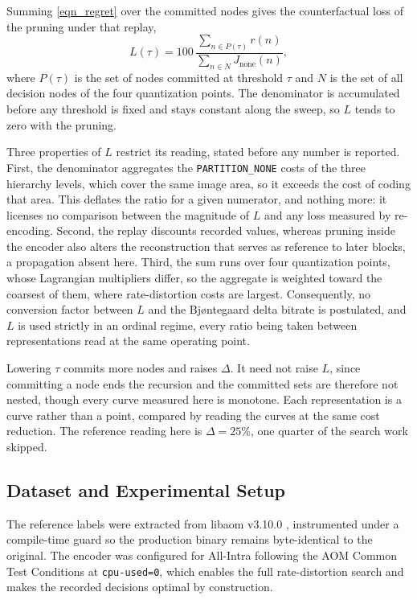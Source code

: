 \documentclass[conference]{IEEEtran}
\begin{document}
Summing \eqref{eqn_regret} over the committed nodes gives the counterfactual loss
of the pruning under that replay,
\begin{equation}
L(\tau) = 100 \, \frac{\sum_{n \in P(\tau)} r(n)}{\sum_{n \in N}
J_{\mathrm{none}}(n)},
\label{eqn_loss}
\end{equation}
where $P(\tau)$ is the set of nodes committed at threshold $\tau$ and $N$ is the
set of all decision nodes of the four quantization points. The denominator is
accumulated before any threshold is fixed and stays constant along the sweep, so $L$ tends to zero with the pruning.

Three properties of $L$ restrict its reading, stated before any number is reported. First, the denominator aggregates the
\texttt{PARTITION\_NONE} costs of the three hierarchy levels, which cover the same
image area, so it exceeds the cost of coding that area. This deflates the ratio
for a given numerator, and nothing more: it licenses no comparison between the
magnitude of $L$ and any loss measured by re-encoding.
Second, the replay discounts recorded values, whereas pruning inside the encoder
also alters the reconstruction that serves as reference to later blocks, a
propagation absent here. Third, the sum runs over four quantization points, whose
Lagrangian multipliers differ, so the aggregate is weighted toward the coarsest of
them, where rate-distortion costs are largest. Consequently, no conversion factor
between $L$ and the Bj\o ntegaard delta bitrate \cite{bjontegaard} is postulated,
and $L$ is used strictly in an ordinal regime, every ratio being taken between representations read at the same operating point.

Lowering $\tau$ commits more nodes and raises $\Delta$. It need not raise $L$,
since committing a node ends the recursion and the committed sets are therefore
not nested, though every curve measured here is monotone. Each representation is
a curve rather than a point, compared by reading the curves at the same cost
reduction. The reference reading here is $\Delta = 25\%$, one quarter of the
search work skipped.

\subsection{Dataset and Experimental Setup}

The reference labels were extracted from libaom v3.10.0 \cite{libaom},
instrumented under a compile-time guard so the production binary remains byte-identical to the original. The encoder was configured for All-Intra following
the AOM Common Test Conditions \cite{ctc} at
\texttt{cpu-used=0}, which enables the full rate-distortion search and makes the recorded decisions optimal by construction.
\end{document}
